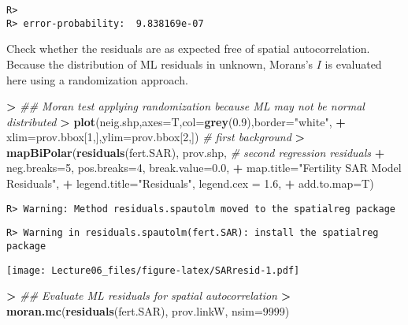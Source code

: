 \documentclass[
]{article}
\newenvironment{Shaded}{\begin{snugshade}}{\end{snugshade}}
\newcommand{\CommentTok}[1]{\textcolor[rgb]{0.56,0.35,0.01}{\textit{#1}}}
\newcommand{\DataTypeTok}[1]{\textcolor[rgb]{0.13,0.29,0.53}{#1}}
\newcommand{\DecValTok}[1]{\textcolor[rgb]{0.00,0.00,0.81}{#1}}
\newcommand{\ErrorTok}[1]{\textcolor[rgb]{0.64,0.00,0.00}{\textbf{#1}}}
\newcommand{\FloatTok}[1]{\textcolor[rgb]{0.00,0.00,0.81}{#1}}
\newcommand{\KeywordTok}[1]{\textcolor[rgb]{0.13,0.29,0.53}{\textbf{#1}}}
\newcommand{\NormalTok}[1]{#1}
\newcommand{\OperatorTok}[1]{\textcolor[rgb]{0.81,0.36,0.00}{\textbf{#1}}}
\newcommand{\StringTok}[1]{\textcolor[rgb]{0.31,0.60,0.02}{#1}}
\begin{document}
\begin{verbatim}
R> 
R> error-probability:  9.838169e-07
\end{verbatim}

Check whether the residuals are as expected free of spatial
autocorrelation. Because the distribution of ML residuals in unknown,
Morans's \(I\) is evaluated here using a randomization approach.

\begin{Shaded}
\begin{Highlighting}[]
\OperatorTok{>}\StringTok{ }\CommentTok{## Moran test applying randomization because ML may not be normal distributed}
\ErrorTok{>}\StringTok{ }\KeywordTok{plot}\NormalTok{(neig.shp,}\DataTypeTok{axes=}\NormalTok{T,}\DataTypeTok{col=}\KeywordTok{grey}\NormalTok{(}\FloatTok{0.9}\NormalTok{),}\DataTypeTok{border=}\StringTok{"white"}\NormalTok{,}
\OperatorTok{+}\StringTok{      }\DataTypeTok{xlim=}\NormalTok{prov.bbox[}\DecValTok{1}\NormalTok{,],}\DataTypeTok{ylim=}\NormalTok{prov.bbox[}\DecValTok{2}\NormalTok{,])                        }\CommentTok{# first background}
\OperatorTok{>}\StringTok{ }\KeywordTok{mapBiPolar}\NormalTok{(}\KeywordTok{residuals}\NormalTok{(fert.SAR), prov.shp,                          }\CommentTok{# second regression residuals}
\OperatorTok{+}\StringTok{             }\DataTypeTok{neg.breaks=}\DecValTok{5}\NormalTok{, }\DataTypeTok{pos.breaks=}\DecValTok{4}\NormalTok{, }\DataTypeTok{break.value=}\FloatTok{0.0}\NormalTok{, }
\OperatorTok{+}\StringTok{             }\DataTypeTok{map.title=}\StringTok{"Fertility SAR Model Residuals"}\NormalTok{,}
\OperatorTok{+}\StringTok{             }\DataTypeTok{legend.title=}\StringTok{"Residuals"}\NormalTok{, }\DataTypeTok{legend.cex =} \FloatTok{1.6}\NormalTok{,}
\OperatorTok{+}\StringTok{             }\DataTypeTok{add.to.map=}\NormalTok{T)}
\end{Highlighting}
\end{Shaded}

\begin{verbatim}
R> Warning: Method residuals.spautolm moved to the spatialreg package
\end{verbatim}

\begin{verbatim}
R> Warning in residuals.spautolm(fert.SAR): install the spatialreg package
\end{verbatim}

\texttt{[image: Lecture06\_files/figure-latex/SARresid-1.pdf]}

\begin{Shaded}
\begin{Highlighting}[]
\OperatorTok{>}\StringTok{ }\CommentTok{## Evaluate ML residuals for spatial autocorrelation}
\ErrorTok{>}\StringTok{ }\KeywordTok{moran.mc}\NormalTok{(}\KeywordTok{residuals}\NormalTok{(fert.SAR), prov.linkW, }\DataTypeTok{nsim=}\DecValTok{9999}\NormalTok{) }
\end{Highlighting}
\end{Shaded}
\end{document}
